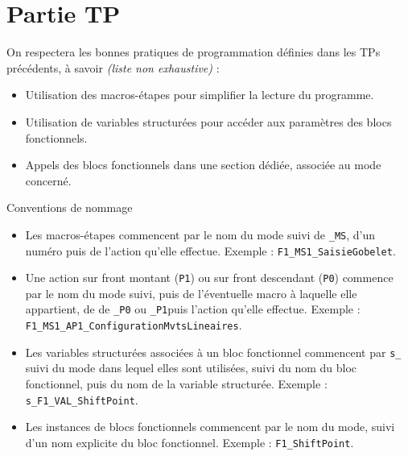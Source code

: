 \section{Partie TP}
On respectera les bonnes pratiques de programmation définies dans les TPs précédents, à savoir \textit{(liste non exhaustive)} :
\begin{itemize}
    \item Utilisation des macros-étapes pour simplifier la lecture du programme.
    \item Utilisation de variables structurées pour accéder aux paramètres des blocs fonctionnels.
    \item Appels des blocs fonctionnels dans une section dédiée, associée au mode concerné.
\end{itemize}

\begin{UPSTIinfor}{Conventions de nommage}
    \begin{itemize}
        \item Les macros-étapes commencent par le nom du mode suivi de \texttt{\_MS}, d'un numéro puis de l'action qu'elle effectue. Exemple : \texttt{F1\_MS1\_SaisieGobelet}.
        \item Une action sur front montant (\texttt{P1}) ou sur front descendant (\texttt{P0}) commence par le nom du mode suivi, puis de l'éventuelle macro à laquelle elle appartient, de de \texttt{\_P0} ou \texttt{\_P1}puis l'action qu'elle effectue. Exemple : \texttt{F1\_MS1\_AP1\_ConfigurationMvtsLineaires}.
        \item Les variables structurées associées à un bloc fonctionnel commencent par \texttt{s\_} suivi du mode dans lequel elles sont utilisées, suivi du nom du bloc fonctionnel, puis du nom de la variable structurée. Exemple : \texttt{s\_F1\_VAL\_ShiftPoint}.
        \item Les instances de blocs fonctionnels commencent par le nom du mode, suivi d'un nom explicite du bloc fonctionnel. Exemple : \texttt{F1\_ShiftPoint}.
    \end{itemize}
\end{UPSTIinfor}

